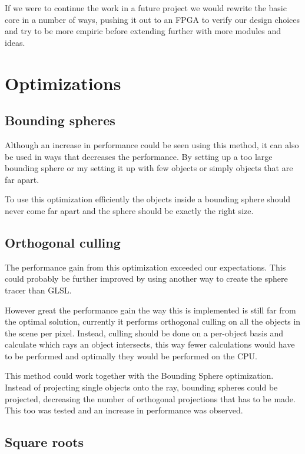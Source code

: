 			If we were to continue the work in a future project we would
			rewrite the basic core in a number of ways, pushing it out to an FPGA to verify our design choices and try to be more empiric before
			extending further with more modules and ideas. 

	\section{Optimizations} \label{optimization}

		\subsection{Bounding spheres}
			
			Although an increase in performance could be seen using this
			method, it can also be used in ways that decreases the performance.
			By setting up a too large bounding sphere or my setting it up with
			few objects or simply objects that are far apart.

			To use this optimization efficiently the objects inside a bounding 
			sphere should never come far apart and the sphere should be exactly 
			the right size.

		\subsection{Orthogonal culling}

			The performance gain from this optimization exceeded our 
			expectations. This could probably be further improved by using
			another way to create the sphere tracer than GLSL. 

			However great the performance gain the way this is implemented
			is still far from the optimal solution, currently it performs 
			orthogonal culling on all the objects in the scene per pixel. 
			Instead, culling should be done on a per-object basis and calculate
			which rays an object intersects, this way fewer calculations would
			have to be performed and optimally they would be performed on the
			CPU.

			This method could work together with the Bounding Sphere 
			optimization. Instead of projecting single objects onto the ray,
			bounding spheres could be projected, decreasing the number of 
			orthogonal projections that has to be made. This too was tested 
			and an increase in performance was observed.

		\subsection{Square roots}

